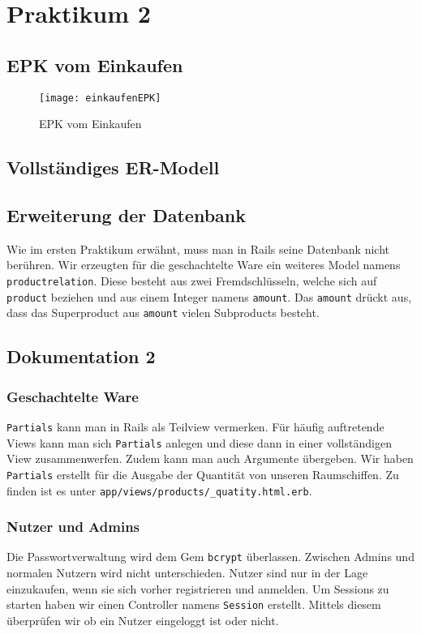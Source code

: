 \section{Praktikum 2}

\subsection{EPK vom Einkaufen}

\begin{figure}[h]
  \caption{EPK vom Einkaufen}
  \label{fig:epk_einkauf}
  \texttt{[image: einkaufenEPK]}
\end{figure}

\subsection{Vollst\"andiges ER-Modell}

\subsection{Erweiterung der Datenbank}
Wie im ersten Praktikum erw\"ahnt, muss man in Rails seine Datenbank nicht ber\"uhren. Wir erzeugten f\"ur die geschachtelte Ware ein weiteres Model namens \texttt{productrelation}. Diese besteht aus zwei Fremdschl\"usseln, welche sich auf \texttt{product} beziehen und aus einem Integer namens \texttt{amount}. Das \texttt{amount} dr\"uckt aus, dass das Superproduct aus \texttt{amount} vielen Subproducts besteht. 

\subsection{Dokumentation 2}

\subsubsection{Geschachtelte Ware}
\texttt{Partials} kann man in Rails als Teilview vermerken. F\"ur h\"aufig auftretende Views kann man sich \texttt{Partials} anlegen und diese dann in einer vollst\"andigen View zusammenwerfen. Zudem kann man auch Argumente \"ubergeben. Wir haben \texttt{Partials} erstellt f\"ur die Ausgabe der Quantit\"at von unseren Raumschiffen. Zu finden ist es unter \texttt{app/views/products/\_quatity.html.erb}. 

\subsubsection{Nutzer und Admins}
Die Passwortverwaltung wird dem Gem \texttt{bcrypt} \"uberlassen. Zwischen Admins und normalen Nutzern wird nicht unterschieden. Nutzer sind nur in der Lage einzukaufen, wenn sie sich vorher registrieren und anmelden. Um Sessions zu starten haben wir einen Controller namens \texttt{Session} erstellt. Mittels diesem \"uberpr\"ufen wir ob ein Nutzer eingeloggt ist oder nicht.

